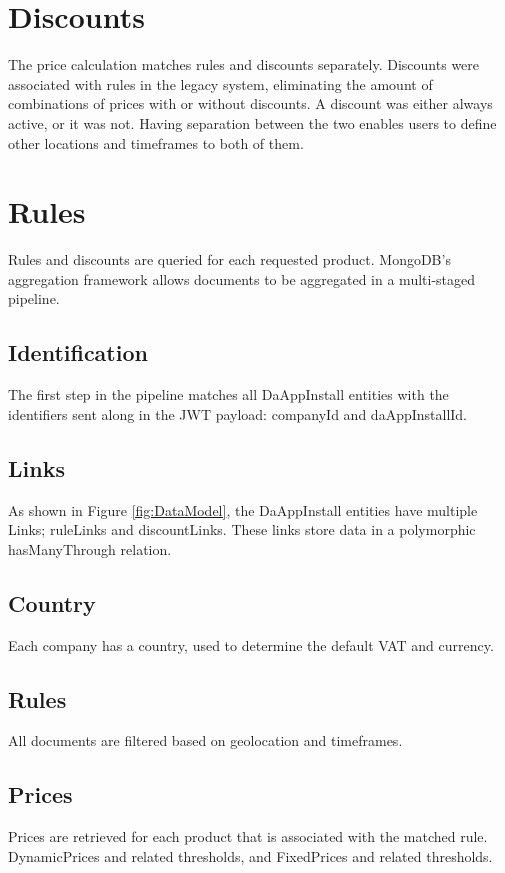 %
\section{Discounts}
The price calculation matches rules and discounts separately. Discounts were associated with rules in the legacy system, eliminating the amount of combinations of prices with or without discounts. A discount was either always active, or it was not. Having separation between the two enables users to define other locations and timeframes to both of them.

%
\section{Rules}
Rules and discounts are queried for each requested product. MongoDB’s aggregation framework allows documents to be aggregated in a multi-staged pipeline.

\subsection{Identification}
The first step in the pipeline matches all DaAppInstall entities with the identifiers sent along in the JWT payload: companyId and daAppInstallId.
\subsection{Links}
As shown in Figure \ref{fig:DataModel}, the DaAppInstall entities have multiple Links; ruleLinks and discountLinks. These links store data in a polymorphic hasManyThrough relation.
\subsection{Country}
Each company has a country, used to determine the default VAT and currency.
\subsection{Rules}
All documents are filtered based on geolocation and timeframes.
\subsection{Prices}
Prices are retrieved for each product that is associated with the matched rule. DynamicPrices and related thresholds, and FixedPrices and related thresholds.
